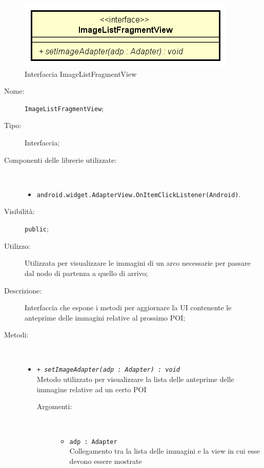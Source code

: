 \documentclass[../DefinizioneDiProdotto.tex]{subfiles}
\begin{document}
    \begin{figure}[H]
        \centering
        \includegraphics{img/ImageListFragmentView.png}
        \caption{Interfaccia ImageListFragmentView}\label{fig:view::ImageListFragmentView} 
    \end{figure}
    \begin{description}
\item[Nome:] \texttt{ImageListFragmentView};
\item[Tipo:] Interfaccia;
\item[Componenti delle librerie utilizzate:] \
\begin{itemize}
\item \texttt{android.widget.AdapterView.OnItemClickListener(Android)}.

\end{itemize}
\item[Visibilità:] \texttt{public};
\item[Utilizzo:] Utilizzata per visualizzare le immagini di un arco necessarie per passare dal nodo di partenza a quello di arrivo;
\item[Descrizione:] Interfaccia che espone i metodi per aggiornare la UI contenente le anteprime delle immagini relative al prossimo POI;
\item[Metodi:] \
\begin{itemize}
\item \texttt{+ \textit{setImageAdapter(adp : Adapter) : void}}\\
Metodo utilizzato per visualizzare la lista delle anteprime delle immagine relative ad un certo POI
 \begin{description}
\item[Argomenti:] \
\begin{itemize}
\item \texttt{adp : Adapter}\\
Collegamento tra la lista delle immagini e la view in cui esse devono essere mostrate\end{itemize}
\end{description}
\end{itemize}
\end{description}
\end{document}
